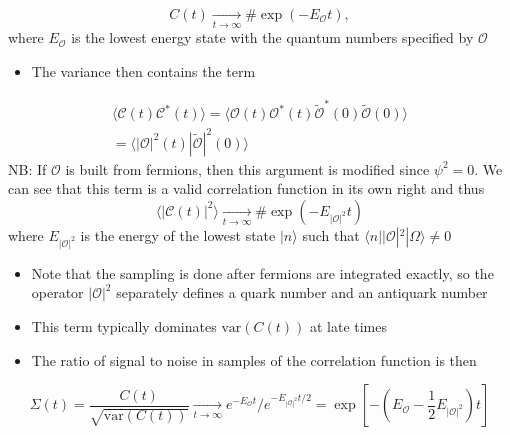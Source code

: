 \begin{equation}
    C(t) \underset{t \to \infty}{\rightarrow} \# \exp(-E_\mathcal{O} t),
\end{equation}
where $E_\mathcal{O}$ is the lowest energy state with the quantum numbers specified by $\mathcal{O}$
\begin{itemize}
    \item The variance then contains the term
\end{itemize}
\begin{align}
    \langle \mathcal{C}(t) \mathcal{C}^*(t)\rangle = \langle \mathcal{O}(t)  \mathcal{O}^*(t) \tilde{\mathcal{O}}^*(0) \tilde{\mathcal{O}}(0) \rangle \nonumber \\
    = \langle | \mathcal{O} |^2(t) |\tilde{\mathcal{O}}|^2(0)\rangle
\end{align}
NB: If $\mathcal{O}$ is built from fermions, then this argument is modified since $\psi^2 = 0$.
We can see that this term is a valid correlation function in its own right and thus
\begin{equation}
    \langle | \mathcal{C}(t)|^2\rangle \underset{t\to\infty}{\rightarrow}\# \exp \left(-E_{|\mathcal{O}|^2} t\right)
\end{equation}
where $E_{|\mathcal{O}|^2}$ is the energy of the lowest state $|n\rangle$ such that $\langle n | |\mathcal{O} |^2 |\Omega \rangle \neq 0$
\begin{itemize}
    \item Note that the sampling is done after fermions are integrated exactly, so the operator $|\mathcal{O}|^2$ separately defines a quark number and an antiquark number
    \item This term typically dominates $\text{var}(C(t))$ at late times
    \item The ratio of signal to noise in samples of the correlation function is then
\end{itemize}
\begin{equation}
    \Sigma(t) = \frac{C(t)}{\sqrt{\text{var}(C(t))}} \underset{t \to \infty}{\rightarrow}e^{- E_\mathcal{O}t} / e^{- E_{| \mathcal{O} |^2} t/2} = \exp \left [ -(E_\mathcal{O} - \frac{1}{2}E_{|\mathcal{O}|^2}) t\right]
\end{equation}


